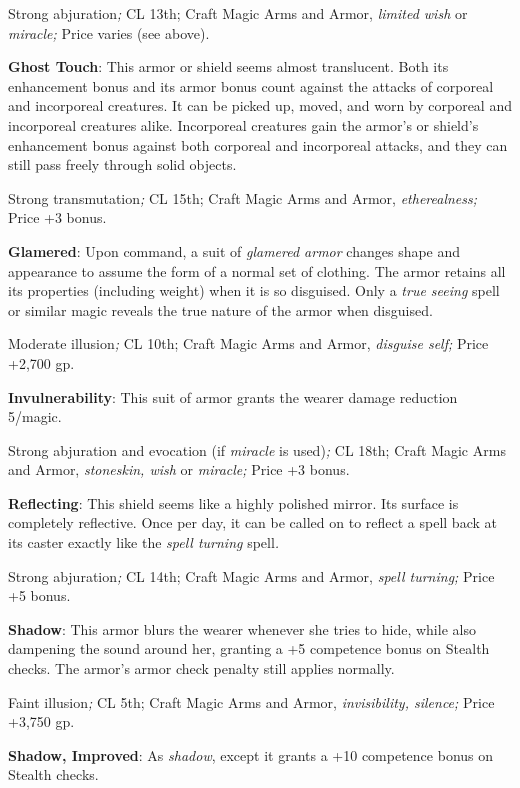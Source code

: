 				
Strong abjuration\textit{; }CL 13th; Craft Magic Arms and Armor, \textit{limited wish }or \textit{miracle; }Price varies (see above).
				
\textbf{Ghost Touch}: This armor or shield seems almost translucent. Both its enhancement bonus and its armor bonus count against the attacks of corporeal and incorporeal creatures. It can be picked up, moved, and worn by corporeal and incorporeal creatures alike. Incorporeal creatures gain the armor's or shield's enhancement bonus against both corporeal and incorporeal attacks, and they can still pass freely through solid objects.
				
Strong transmutation\textit{; }CL 15th; Craft Magic Arms and Armor, \textit{etherealness; }Price +3 bonus.
				
\textbf{Glamered}: Upon command, a suit of \textit{glamered armor} changes shape and appearance to assume the form of a normal set of clothing. The armor retains all its properties (including weight) when it is so disguised. Only a \textit{true seeing }spell or similar magic reveals the true nature of the armor when disguised.
				
Moderate illusion\textit{; }CL 10th; Craft Magic Arms and Armor, \textit{disguise self; }Price +2,700 gp.
				
\textbf{Invulnerability}: This suit of armor grants the wearer damage reduction 5/magic.
				
Strong abjuration and evocation (if \textit{miracle }is used)\textit{; }CL 18th; Craft Magic Arms and Armor, \textit{stoneskin, wish }or \textit{miracle; }Price +3 bonus.
				
\textbf{Reflecting}: This shield seems like a highly polished mirror. Its surface is completely reflective. Once per day, it can be called on to reflect a spell back at its caster exactly like the \textit{spell turning }spell\textit{.}
				
Strong abjuration\textit{; }CL 14th; Craft Magic Arms and Armor, \textit{spell turning; }Price +5 bonus.
				
\textbf{Shadow}: This armor blurs the wearer whenever she tries to hide, while also dampening the sound around her, granting a +5 competence bonus on Stealth checks. The armor's armor check penalty still applies normally.
				
Faint illusion\textit{; }CL 5th; Craft Magic Arms and Armor, \textit{invisibility, silence; }Price +3,750 gp.
				
\textbf{Shadow, Improved}: As \textit{shadow}, except it grants a +10 competence bonus on Stealth checks.
				

